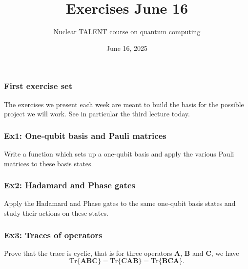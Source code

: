 \documentclass{beamer}
\begin{document}

\newcommand{\exercisesection}[1]{\subsection*{#1}}







\title{Exercises June 16}


\author{Nuclear TALENT course on quantum computing\inst{}}
\institute{}

\date{June 16, 2025
}

\begin{frame}
\titlepage
\end{frame}

\begin{frame}
\frametitle{First exercise set}

The exercises we present each week are meant to build the basis for
the possible  project we will work. See in particular the third lecture today.
\end{frame}

\begin{frame}
\frametitle{Ex1: One-qubit basis and  Pauli matrices}

Write a function which sets up a one-qubit basis and apply the various Pauli matrices to these basis states.
\end{frame}

\begin{frame}
\frametitle{Ex2: Hadamard and Phase gates}

Apply the Hadamard and Phase gates to the same one-qubit basis states and study their actions on these states.
\end{frame}

\begin{frame}
\frametitle{Ex3: Traces of operators}

Prove that the trace is cyclic, that is for three operators $\bm{A}$, $\bm{B}$ and $\bm{C}$, we have
\[
\mathrm{Tr}\{\bm{ABC}\}=\mathrm{Tr}\{\bm{CAB}\}=\mathrm{Tr}\{\bm{BCA}\}.
\]
\end{frame}
\end{document}
